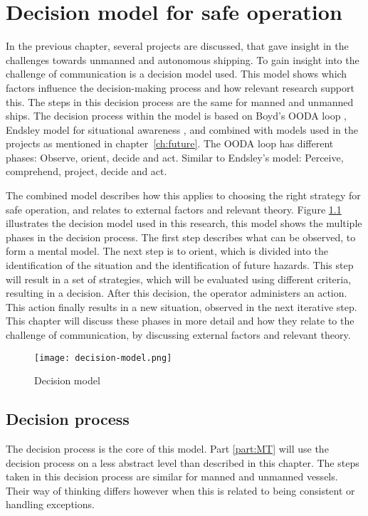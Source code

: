 \chapter{Decision model for safe operation}
\label{ch:model}
In the previous chapter, several projects are discussed, that gave insight in the challenges towards unmanned and autonomous shipping. To gain insight into the challenge of communication is a decision model used. This model shows which factors influence the decision-making process and how relevant research support this. The steps in this decision process are the same for manned and unmanned ships.
The decision process within the model is based on Boyd's OODA loop \cite{Boyd1987}, Endsley model for situational awareness \cite{Endsley2013}, and combined with models used in the projects as mentioned in chapter~\ref{ch:future}. 
The OODA loop has different phases: Observe, orient, decide and act. Similar to Endsley's model: Perceive, comprehend, project, decide and act. 

The combined model describes how this applies to choosing the right strategy for safe operation, and relates to external factors and relevant theory. Figure \ref{fig:decision-model} illustrates the decision model used in this research, this model shows the multiple phases in the decision process. The first step describes what can be observed, to form a mental model. The next step is to orient, which is divided into the identification of the situation and the identification of future hazards. This step will result in a set of strategies, which will be evaluated using different criteria, resulting in a decision. After this decision, the operator administers an action. This action finally results in a new situation, observed in the next iterative step. This chapter will discuss these phases in more detail and how they relate to the challenge of communication, by discussing external factors and relevant theory.

\begin{figure}[p]
	\centering
	\texttt{[image: decision-model.png]}
	\caption{Decision model}
	\label{fig:decision-model}
\end{figure}

\section{Decision process}
The decision process is the core of this model. Part \ref{part:MT} will use the decision process on a less abstract level than described in this chapter. The steps taken in this decision process are similar for manned and unmanned vessels. Their way of thinking differs however when this is related to being consistent or handling exceptions.

